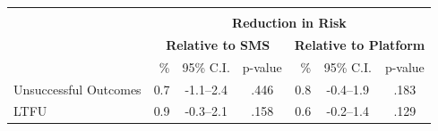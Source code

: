 \scriptsize{\def\sym#1{\ifmmode^{#1}\else\(^{#1}\)\fi}
\begin{tabular}{l|rcc|rcc}
\hline\hline \\[-8pt]
\rowcolor{yellow!15}	& \multicolumn{6}{c}{\textbf{Reduction in Risk}} \\
\rowcolor{yellow!15}	& \multicolumn{3}{c|}{\textbf{Relative to SMS}}  & \multicolumn{3}{c}{\textbf{Relative to Platform}}  \\
\rowcolor{yellow!15} & \% & 95\% C.I. & p-value & \% & 95\% C.I. & p-value \\ \hline
Unsuccessful Outcomes & 0.7 & -1.1--2.4 & .446 & 0.8 & -0.4--1.9 & .183 \\
LTFU & 0.9 & -0.3--2.1 & .158 & 0.6 & -0.2--1.4 & .129 \\
\hline \hline
\end{tabular}}